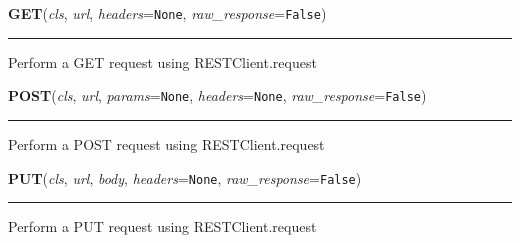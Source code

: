 \hspace{.8\funcindent}\begin{boxedminipage}{\funcwidth}

    \raggedright \textbf{GET}(\textit{cls}, \textit{url}, \textit{headers}={\tt None}, \textit{raw\_response}={\tt False})

    \vspace{-1.5ex}

    \rule{\textwidth}{0.5\fboxrule}
\setlength{\parskip}{2ex}
    Perform a GET request using RESTClient.request

\setlength{\parskip}{1ex}
    \end{boxedminipage}

    \label{lib:dropbox:RESTClient:POST}

    \vspace{0.5ex}

\hspace{.8\funcindent}\begin{boxedminipage}{\funcwidth}

    \raggedright \textbf{POST}(\textit{cls}, \textit{url}, \textit{params}={\tt None}, \textit{headers}={\tt None}, \textit{raw\_response}={\tt False})

    \vspace{-1.5ex}

    \rule{\textwidth}{0.5\fboxrule}
\setlength{\parskip}{2ex}
    Perform a POST request using RESTClient.request

\setlength{\parskip}{1ex}
    \end{boxedminipage}

    \label{lib:dropbox:RESTClient:PUT}

    \vspace{0.5ex}

\hspace{.8\funcindent}\begin{boxedminipage}{\funcwidth}

    \raggedright \textbf{PUT}(\textit{cls}, \textit{url}, \textit{body}, \textit{headers}={\tt None}, \textit{raw\_response}={\tt False})

    \vspace{-1.5ex}

    \rule{\textwidth}{0.5\fboxrule}
\setlength{\parskip}{2ex}
    Perform a PUT request using RESTClient.request

\setlength{\parskip}{1ex}
    \end{boxedminipage}


